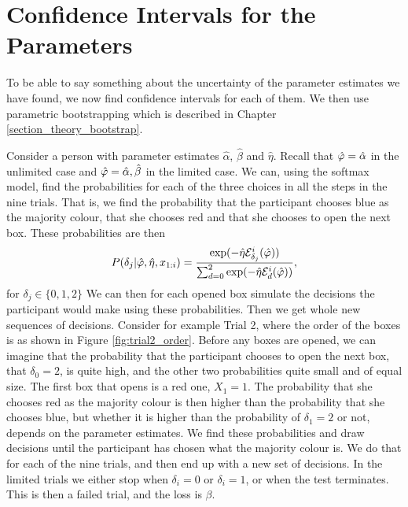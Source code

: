 \section{Confidence Intervals for the Parameters}
\label{chapter:CIs_chap3}
To be able to say something about the uncertainty of the parameter estimates we have found, we now find confidence intervals for each of them. We then use parametric bootstrapping which is described in Chapter \ref{section_theory_bootstrap}.

Consider a person with parameter estimates $\hat{\alpha}$, $\hat{\beta}$ and $\hat{\eta}$. Recall that $\hat{\varphi}=\hat{\alpha}$ in the unlimited case and $\hat{\varphi}=\hat{\alpha},\hat{\beta}$ in the limited case. 
We can, using the softmax model, find the probabilities for each of the three choices in all the steps in the nine trials. That is, we find the probability that the participant chooses blue as the majority colour, that she chooses red and that she chooses to open the next box. These probabilities are then
\begin{equation}
\label{probabilities_bootstrap}
    P(\delta_{j}|\hat{\varphi},\hat{\eta},x_{1:i}) = \frac{\text{exp}(- \hat{\eta} \mathcal{E}^i_{\delta_j}(\hat{\varphi}))}{\sum_{d=0}^{2} \text{exp}(-\hat{\eta} \mathcal{E}^i_{d}(\hat{\varphi}))},
\end{equation}
for $\delta_j \in \{0,1,2 \}$
We can then for each opened box simulate the decisions the participant would make using these probabilities. Then we get whole new sequences of decisions. Consider for example Trial 2, where the order of the boxes is as shown in Figure \ref{fig:trial2_order}. Before any boxes are opened, we can imagine that the probability that the participant chooses to open the next box, that $\delta_0=2$, is quite high, and the other two probabilities quite small and of equal size. The first box that opens is a red one, $X_1=1$. The probability that she chooses red as the majority colour is then higher than the probability that she chooses blue, but whether it is higher than the probability of $\delta_1=2$ or not, depends on the parameter estimates. We find these probabilities and draw decisions until the participant has chosen what the majority colour is. We do that for each of the nine trials, and then end up with a new set of decisions. In the limited trials we either stop when $\delta_i=0$ or $\delta_i=1$, or when the test terminates. This is then a failed trial, and the loss is $\beta$. 

